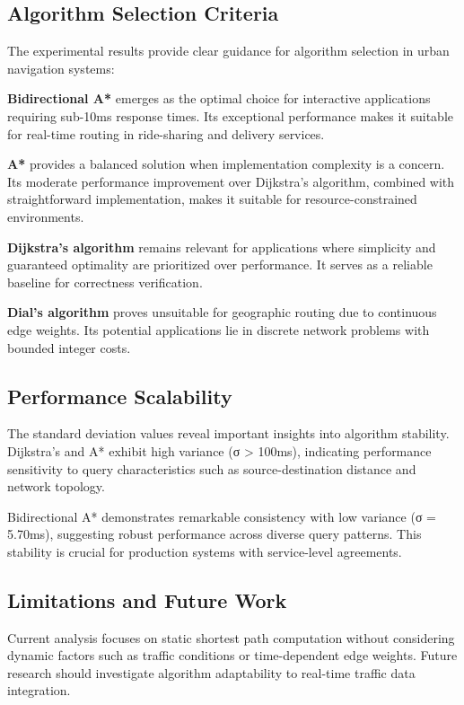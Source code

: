 \documentclass[conference]{IEEEtran}
\begin{document}
\subsection{Algorithm Selection Criteria}

The experimental results provide clear guidance for algorithm selection in urban navigation systems:

\textbf{Bidirectional A*} emerges as the optimal choice for interactive applications requiring sub-10ms response times. Its exceptional performance makes it suitable for real-time routing in ride-sharing and delivery services.

\textbf{A*} provides a balanced solution when implementation complexity is a concern. Its moderate performance improvement over Dijkstra's algorithm, combined with straightforward implementation, makes it suitable for resource-constrained environments.

\textbf{Dijkstra's algorithm} remains relevant for applications where simplicity and guaranteed optimality are prioritized over performance. It serves as a reliable baseline for correctness verification.

\textbf{Dial's algorithm} proves unsuitable for geographic routing due to continuous edge weights. Its potential applications lie in discrete network problems with bounded integer costs.

\subsection{Performance Scalability}

The standard deviation values reveal important insights into algorithm stability. Dijkstra's and A* exhibit high variance (σ > 100ms), indicating performance sensitivity to query characteristics such as source-destination distance and network topology.

Bidirectional A* demonstrates remarkable consistency with low variance (σ = 5.70ms), suggesting robust performance across diverse query patterns. This stability is crucial for production systems with service-level agreements.

\subsection{Limitations and Future Work}

Current analysis focuses on static shortest path computation without considering dynamic factors such as traffic conditions or time-dependent edge weights. Future research should investigate algorithm adaptability to real-time traffic data integration.
\end{document}
